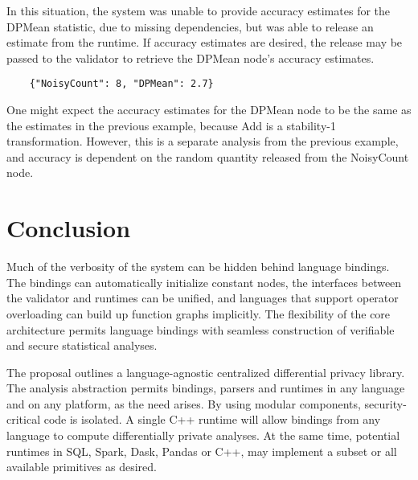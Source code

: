 \documentclass[11pt]{article}
\begin{document}
In this situation, the system was unable to provide accuracy estimates for the DPMean statistic, due to missing dependencies, but was able to release an estimate from the runtime. If accuracy estimates are desired, the release may be passed to the validator to retrieve the DPMean node's accuracy estimates.
\begin{verbatim}
    {"NoisyCount": 8, "DPMean": 2.7}
\end{verbatim}
One might expect the accuracy estimates for the DPMean node to be the same as the estimates in the previous example, because Add is a stability-1 transformation. However, this is a separate analysis from the previous example, and accuracy is dependent on the random quantity released from the NoisyCount node.

\section{Conclusion}
Much of the verbosity of the system can be hidden behind language bindings. The bindings can automatically initialize constant nodes, the interfaces between the validator and runtimes can be unified, and languages that support operator overloading can build up function graphs implicitly. The flexibility of the core architecture permits language bindings with seamless construction of verifiable and secure statistical analyses.

The proposal outlines a language-agnostic centralized differential privacy library. The analysis abstraction permits bindings, parsers and runtimes in any language and on any platform, as the need arises. By using modular components, security-critical code is isolated. A single C++ runtime will allow bindings from any language to compute differentially private analyses. At the same time, potential runtimes in SQL, Spark, Dask, Pandas or C++, may implement a subset or all available primitives as desired.
\end{document}
